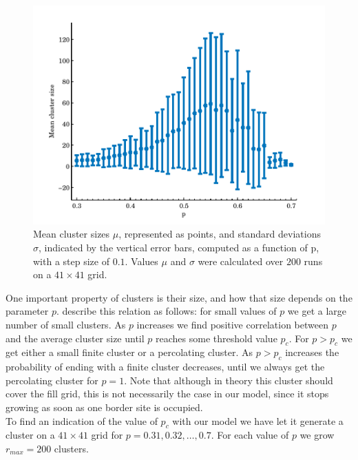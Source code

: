 
\begin{figure}
	\centering
	\includegraphics[width=\textwidth]{./img/assignment_a_mean_std_p.pdf}
	\caption{Mean cluster sizes $\mu$, represented as points, and standard deviations $\sigma$, indicated by the vertical error bars, computed as a function of p, with a step size of $0.1$. Values $\mu$ and $\sigma$ were calculated over $200$ runs on a $41 \times 41$ grid.}
	\label{fig:experiment:mean_std_clusters}
\end{figure}

One important property of clusters is their size, and how that size depends on the parameter $p$. \textcite{kenzel1997physics} describe this relation as follows: for small values of $p$ we get a large number of small clusters. As $p$ increases we find positive correlation between $p$ and the average cluster size until $p$ reaches some threshold value $p_c$. For $p > p_c$ we get either a small finite cluster or a percolating cluster. As $p > p_c$ increases the probability of ending with a finite cluster decreases, until we always get the percolating cluster for $p =1 $. Note that although in theory this cluster should cover the fill grid, this is not necessarily the case in our model, since it stops growing as soon as one border site is occupied. \\

To find an indication of the value of $p_c$ with our model we have let it generate a cluster on a $41 \times 41$ grid for $p = 0.31, 0.32, \dotsc, 0.7$. For each value of $p$ we grow $r_{max} = 200$ clusters. 

